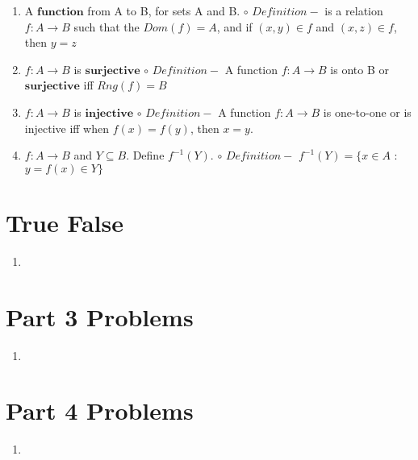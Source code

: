 \documentclass[11pt]{article}
\begin{document}
\begin{enumerate}
    \item A $\mathbf{function}$ from A to B, for sets A and B.
        \newline $\circ$ $Definition - $ is a relation $f:A\rightarrow B$ such that the $Dom(f) = A$, and if $(x,y) \in f$ and $(x,z) \in f$, then $y=z$
    \item $f:A\rightarrow B$ is $\mathbf{surjective}$
        \newline $\circ$ $Definition - $ A function $f:A\rightarrow B$ is onto B or $\mathbf{surjective}$ iff $Rng(f) = B$
    \item $f:A\rightarrow B$ is $\mathbf{injective}$
        \newline $\circ$ $Definition - $ A function $f:A \rightarrow B$ is one-to-one or is injective iff when $f(x)=f(y)$, then $x=y$.
    \item $f:A\rightarrow B$ and $Y \subseteq B$. Define $f^{-1}(Y).$
        \newline $\circ$ $Definition - $ $f^{-1}(Y) = \{x \in A$ : $y=f(x) \in Y\}$
\end{enumerate}
\pagebreak

\section*{True False}
\begin{enumerate}
    \item 
\end{enumerate}
\pagebreak

\section*{Part 3 Problems}
\begin{enumerate}
    \item 
\end{enumerate}
\pagebreak

\section*{Part 4 Problems}
\begin{enumerate}
    \item 
\end{enumerate}
\pagebreak
\end{document}
